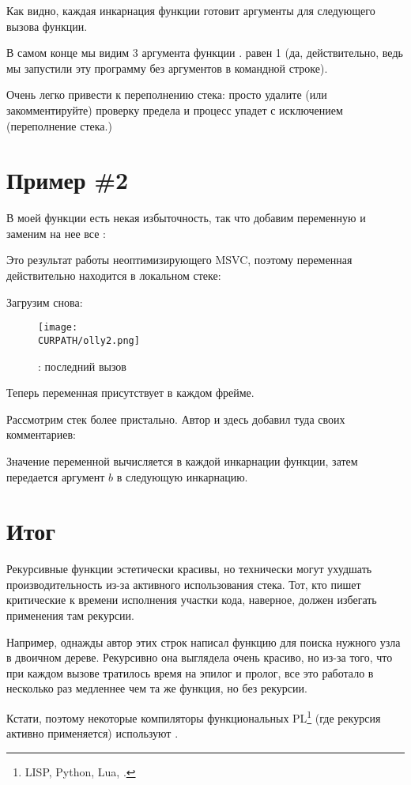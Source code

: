 
Как видно, каждая инкарнация функции готовит аргументы для следующего вызова функции.

В самом конце мы видим 3 аргумента функции \main. 
 равен 1 (да, действительно, ведь мы запустили эту программу
без аргументов в командной строке).

Очень легко привести к переполнению стека: просто удалите (или закомментируйте) проверку
предела и процесс упадет с исключением  (переполнение стека.)

\section{Пример \#2}

В моей функции есть некая избыточность, так что добавим переменную  и заменим на нее
все :



Это результат работы неоптимизирующего MSVC, поэтому переменная  действительно
находится в локальном стеке:



\clearpage
Загрузим \olly снова:

\begin{figure}[H]
\centering
\texttt{[image: \\CURPATH/olly2.png]}
\caption{\olly: последний вызов \ttf{}}
\label{fig:fib_olly2}
\end{figure}

Теперь переменная  присутствует в каждом фрейме.

\clearpage
Рассмотрим стек более пристально. Автор и здесь добавил туда своих комментариев:



Значение переменной  вычисляется в каждой инкарнации функции, затем передается
аргумент $b$ в следующую инкарнацию.

\section{Итог}

\label{Recursion_and_tail_call}
\myindex{\Recursion}
Рекурсивные функции эстетически красивы, но технически могут ухудшать производительность
из-за активного использования стека.
Тот, кто пишет критические к времени исполнения участки кода, наверное, должен избегать 
применения там рекурсии.

Например, однажды автор этих строк написал функцию для поиска нужного узла в двоичном дереве. 
Рекурсивно она выглядела очень красиво, но из-за того, что при каждом вызове тратилось время на эпилог и пролог, 
все это работало в несколько раз медленнее чем та же функция, но без рекурсии.

\newcommand{\FnFP}{\footnote{LISP, Python, Lua, \etc{}.}}
Кстати, поэтому некоторые компиляторы функциональных \ac{PL}\FnFP{} (где рекурсия активно применяется) используют .

